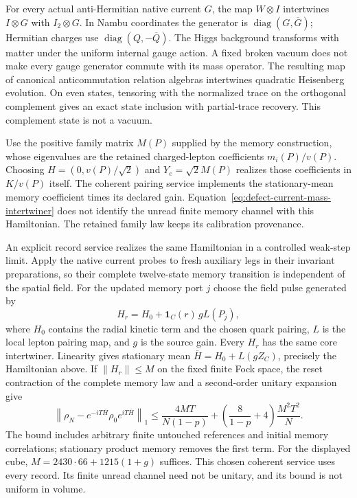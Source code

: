 For every actual anti-Hermitian native current $G$, the map $W\otimes I$
intertwines $I\otimes G$ with $I_2\otimes G$. In Nambu coordinates the
generator is $\operatorname{diag}(G,\overline G)$; Hermitian charges use
$\operatorname{diag}(Q,-\overline Q)$. The Higgs background transforms
with matter under the uniform internal gauge action. A fixed broken vacuum does not
make every gauge generator commute with its mass operator. The resulting
map of canonical anticommutation relation algebras intertwines quadratic
Heisenberg evolution. On even states, tensoring with the normalized trace
on the orthogonal complement gives an exact state inclusion with
partial-trace recovery. This complement state is not a vacuum.

Use the positive family matrix $M(P)$ supplied by the memory construction,
whose eigenvalues are the retained charged-lepton coefficients
$m_i(P)/v(P)$. Choosing $H=(0,v(P)/\sqrt2)$ and
$Y_e=\sqrt2 M(P)$ realizes those coefficients in $K/v(P)$ itself.
The coherent pairing service implements the stationary-mean memory
coefficient times its declared gain. Equation~\eqref{eq:defect-current-mass-intertwiner}
does not identify the unread finite memory channel with this Hamiltonian.
The retained family law keeps its calibration provenance.

An explicit record service realizes the same Hamiltonian in a controlled
weak-step limit. Apply the native current probes to fresh auxiliary legs
in their invariant preparations, so their complete twelve-state memory
transition is independent of the spatial field. For the updated memory
port $j$ choose the field pulse generated by
\[
 H_r=H_0+\mathbf1_C(r)\,g L(P_j),
\]
where $H_0$ contains the radial kinetic term and the chosen quark pairing,
$L$ is the local lepton pairing map, and $g$ is the source gain.
Every $H_r$ has the same core intertwiner. Linearity gives stationary
mean $\overline H=H_0+L(gZ_C)$, precisely the Hamiltonian above.
If $\|H_r\|\le M$ on the fixed finite Fock space, the reset contraction
of the complete memory law and a second-order unitary expansion give
\[
 \left\|\rho_N-e^{-iT\overline H}\rho_0e^{iT\overline H}\right\|_1
 \le \frac{4MT}{N(1-p)}
       +\left(\frac8{1-p}+4\right)\frac{M^2T^2}{N}.
\]
The bound includes arbitrary finite untouched references and initial
memory correlations; stationary product memory removes the first term.
For the displayed cube, $M=2430\cdot66+1215(1+g)$ suffices.
This chosen coherent service uses every record. Its finite unread channel
need not be unitary, and its bound is not uniform in volume.

